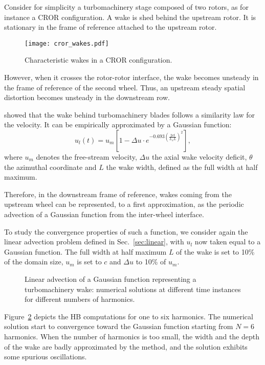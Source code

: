 
Consider for simplicity a turbomachinery stage composed of two rotors,
as for instance a CROR configuration.
A wake is shed behind the upstream rotor. 
It is stationary in the frame of reference attached to the upstream rotor.
\begin{figure}[htp]
    \centering\texttt{[image: cror\_wakes.pdf]}
  \caption{Characteristic wakes in a CROR configuration.}
  \label{fig:rotor-stator}
\end{figure}
However, when it crosses the rotor-rotor interface,
the wake becomes unsteady in the frame of reference of the second wheel. 
Thus, an upstream steady spatial distortion becomes unsteady in
the downstream row.

\citet{Lakshminarayana1980} showed that the wake
behind turbomachinery blades follows a similarity law for the velocity. 
It can be empirically approximated by a Gaussian function:
\begin{equation}
    u_l (t) = u_m \left[1 - 
        \Delta u \cdot e^{
          -0.693 \left(\frac{2 c t}{L_x L} \right) ^ 2}\right],
    \label{eq:similarity}
\end{equation}
where $u_m$ denotes the free-stream velocity, $\Delta u$ the axial wake velocity deficit,
$\theta$ the azimuthal coordinate and $L$ the wake width,
defined as the full width at half maximum.

Therefore, in the downstream frame of reference, wakes coming 
from the upstream wheel can be represented, 
to a first approximation, as the periodic 
advection of a Gaussian function from the inter-wheel interface.

To study the convergence properties of such a function,
we consider again the linear advection problem defined in Sec.~\ref{sec:linear}, 
with $u_l$ now taken equal to a Gaussian function.
The full width at half maximum $L$ of the wake is set to 10\% of the domain size, 
$u_m$ is set to $c$ and $\Delta u$ to 10\% of $u_m$.

\begin{figure}[htp]
  \centering
  \caption{Linear advection of a Gaussian function representing a turbomachinery wake: 
  numerical solutions at different time instances for different numbers of harmonics.}
  \label{fig:inj_wake_results}
\end{figure}
Figure~\ref{fig:inj_wake_results} depicts the HB
computations for one to six harmonics. The numerical solution start to convergence
toward the Gaussian function starting from $N=6$ harmonics.
When the number of harmonics is
too small, the width and the depth of the wake are badly approximated
by the method, and the solution exhibits some spurious oscillations. 

